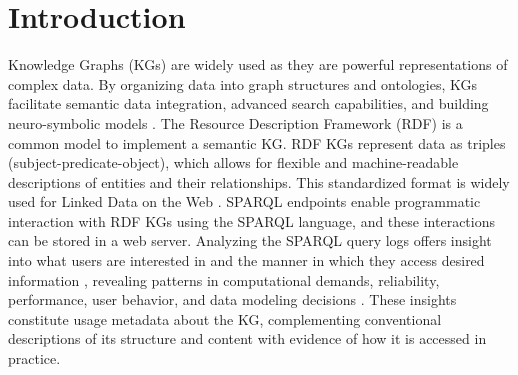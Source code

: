 \documentclass[sw]{iosart2x}
\begin{document}
\begin{frontmatter}
\begin{keyword}
\end{keyword}

\end{frontmatter}


\section{ Introduction }\label{s1}



Knowledge Graphs (KGs) are widely used as they are powerful representations of complex data. By organizing data into graph structures and ontologies, KGs facilitate semantic data integration, advanced search capabilities, and building neuro-symbolic  models \cite{abu2021domain,peng2023knowledge}. The Resource Description Framework (RDF) is a common model to implement a semantic KG. RDF KGs represent data as triples (subject-predicate-object), which allows for flexible and machine-readable descriptions of entities and their relationships. This standardized format is widely used for Linked Data on the Web \cite{ali2022survey}. SPARQL endpoints enable programmatic interaction with RDF KGs using the SPARQL language, and these interactions can be stored in a web server. Analyzing the SPARQL query logs offers insight into what users are interested in and the manner in which they access desired information \cite{bielefeldt2018practical}, revealing patterns in computational demands, reliability, performance, user behavior, and data modeling decisions \cite{asprino2023your, mohammadi2022semi, Handschuh2010LearningFL,bonifati2017analytical,kaminski2018complexity, picalausa2011real,lorey2013detecting, raghuveer2012characterizing,rietveld2014man}. These insights constitute usage metadata about the KG, complementing conventional descriptions of its structure and content with evidence of how it is accessed in practice.
\end{document}
